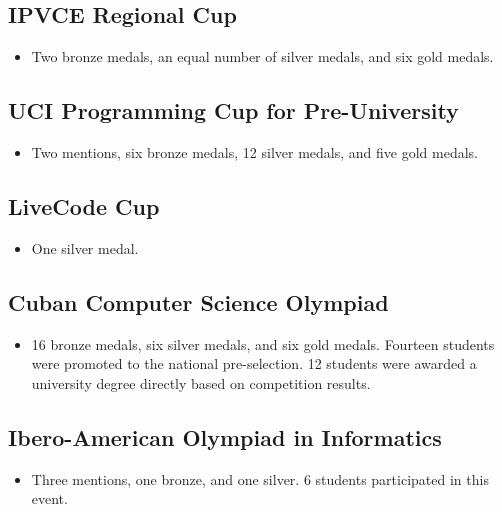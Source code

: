 \subsection{IPVCE Regional Cup}

\begin{itemize}
	\item Two bronze medals, an equal number of silver medals, and six gold medals.
\end{itemize}

\subsection{UCI Programming Cup for Pre-University}

\begin{itemize}
	\item Two mentions, six bronze medals, 12 silver medals, and five gold medals.
\end{itemize}

\subsection{LiveCode Cup}

\begin{itemize}
	\item One silver medal.
\end{itemize}

\subsection{Cuban Computer Science Olympiad}

\begin{itemize}
	\item 16 bronze medals, six silver medals, and six gold medals. Fourteen students were promoted to the national pre-selection. 12 students were awarded a university degree directly
	based on competition results.
\end{itemize}

\subsection{Ibero-American Olympiad in Informatics}

\begin{itemize}
	\item Three mentions, one bronze, and one silver. 6 students participated in this event.
\end{itemize}

